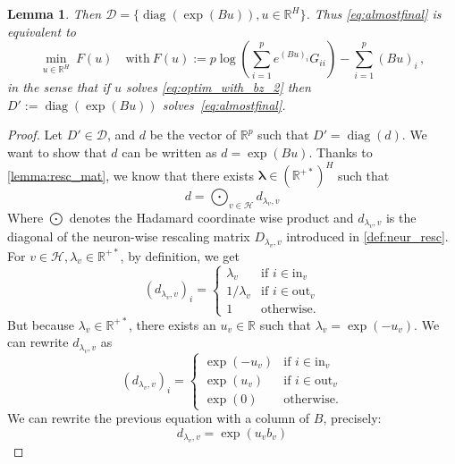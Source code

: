 \documentclass{article}
\theoremstyle{plain}
\newtheorem{lemma}[theorem]{Lemma}
\theoremstyle{definition}
\theoremstyle{remark}
\def\Dcal{\mathcal{D}}
\def\diag{\text{diag}}
\def\diag{\operatorname{diag}}
\def\R{{\mathbb{R}}}
\def\Dcal{{\mathcal{D}}}
\begin{document}
{\begin{lemma}
Then $\Dcal = \{\diag(\exp(Bu)), u \in \R^H\}$. 
Thus \eqref{eq:almostfinal} is equivalent to 
\begin{equation}
\label{eq:optim_with_bz_2}
\min_{u \in \R^{H}} \ F(u)\quad \text{with}\ F(u) :=p\log(\sum_{i=1}^{p} e^{(Bu)_i} G_{ii}) - \sum_{i=1}^{p} (Bu)_i\,,
\end{equation}
in the sense that if $u$ solves \eqref{eq:optim_with_bz_2} then $D' := \diag(\exp(Bu))$ solves~\eqref{eq:almostfinal}.
\end{lemma}
\begin{proof}
Let $D' \in \Dcal$, and $d$ be the vector of $\mathbb{R}^p$ such that $D' = \diag(d)$.
We want to show that $d$ can be written as $d = \exp(Bu)$.
Thanks to \cref{lemma:resc_mat}, we know that there exists $\boldsymbol{\lambda} \in (\mathbb{R}^{+*})^{H}$ such that 
\begin{equation}
    \label{eq:resc_vec}
    d = \bigodot_{v \in \mathcal{H}} d_{\lambda_v, v}
\end{equation}
Where $\bigodot$ denotes the Hadamard coordinate wise product and $d_{\lambda_v, v}$ is the diagonal of the neuron-wise rescaling matrix $D_{\lambda_v,v}$ introduced in \cref{def:neur_resc}.
For $v \in \mathcal{H}, \lambda_v \in \mathbb{R^{+*}}$, by definition, we get 
\begin{equation}
    (d_{\lambda_v, v})_i = \begin{cases}
        \lambda_v & \text{if } i \in \mathrm{in}_v\\
        1/\lambda_v & \text{if } i \in \mathrm{out}_v\\
        1 & \text{otherwise}.
    \end{cases}
\end{equation}
But because $\lambda_v \in \mathbb{R^{+*}}$, there exists an $u_v \in \mathbb{R}$ such that $\lambda_v = \exp(-u_v)$. We can rewrite $d_{\lambda_v, v}$ as 
\begin{equation}
    (d_{\lambda_v, v})_i = \begin{cases}
        \exp(-u_v) & \text{if } i \in \mathrm{in}_v\\
        \exp(u_v) & \text{if } i \in \mathrm{out}_v\\
        \exp(0) & \text{otherwise}.
    \end{cases}
\end{equation}
We can rewrite the previous equation with a column of $B$, precisely:
\begin{equation}
    d_{\lambda_v, v} = \exp(u_v b_v)
\end{equation}

\end{proof}}
\end{document}
